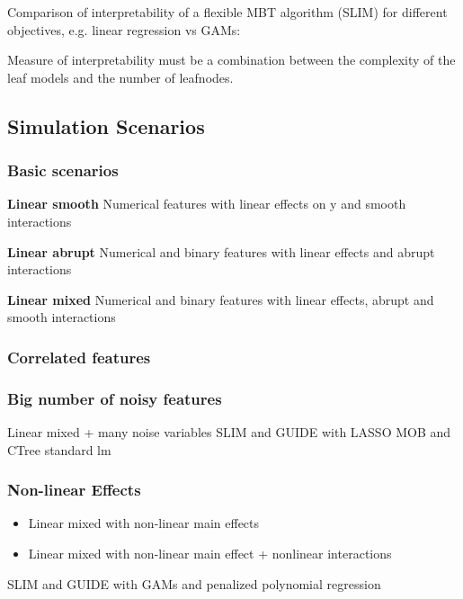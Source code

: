 \vspace{0.5cm}

Comparison of interpretability of a flexible MBT algorithm (SLIM) for different objectives, e.g. linear regression vs GAMs:

Measure of interpretability must be a combination between the complexity of the leaf models and the number of leafnodes.

\subsection{Simulation Scenarios}

\subsubsection{Basic scenarios}
\textbf{Linear smooth}
Numerical features with linear effects on y and smooth interactions


\textbf{Linear abrupt}
Numerical and binary features with linear effects and abrupt interactions

\textbf{Linear mixed}
Numerical and binary features with linear effects, abrupt and smooth interactions

\subsubsection{Correlated features}

\subsubsection{Big number of noisy features}
Linear mixed + many noise variables
SLIM and GUIDE with LASSO
MOB and CTree standard lm

\subsubsection{Non-linear Effects}
\begin{itemize}
    \item Linear mixed with non-linear main effects
    \item Linear mixed with non-linear main effect + nonlinear interactions
\end{itemize}

SLIM and GUIDE with GAMs and penalized polynomial regression


